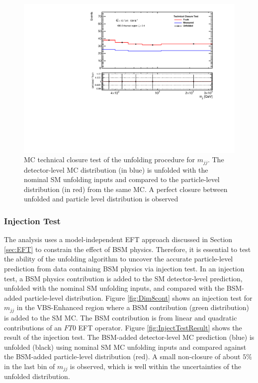 \begin{figure}[!htb]
\centering
\includegraphics[width=.6\textwidth]{figures/Analysis/Unfolding/technical_closure_VBS_Enhanced.pdf}
\caption{MC technical closure test of the unfolding procedure for $m_{jj}$. The detector-level MC distribution (in blue) is unfolded with the nominal SM unfolding inputs and compared to the particle-level distribution (in red) from the same MC. A perfect closure between unfolded and particle level distribution is observed\label{fig:unfolding_technical_closure}}
\end{figure}

\subsubsection{Injection Test}
\label{subsubsec:InjectionTest}
The analysis uses a model-independent EFT approach discussed in Section \ref{sec:EFT} to constrain the effect of BSM physics. Therefore, it is essential to test the ability of the unfolding algorithm to uncover the accurate particle-level prediction from data containing BSM physics via injection test. In an injection test, a BSM physics contribution is added to the SM detector-level prediction, unfolded with the nominal SM unfolding inputs, and compared with the BSM-added particle-level distribution. Figure \ref{fig:Dim8cont} shows an injection test for $m_{jj}$ in the VBS-Enhanced region where a BSM contribution (green distribution) is added to the SM MC. The BSM contribution is from linear and quadratic contributions of an $FT0$ EFT operator. Figure \ref{fig:InjectTestResult} shows the result of the injection test. The BSM-added detector-level MC prediction (blue) is unfolded (black) using nominal SM MC unfolding inputs and compared against the BSM-added particle-level distribution (red). A small non-closure of about $5\%$ in the last bin of $m_{jj}$ is observed, which is well within the uncertainties of the unfolded distribution.


